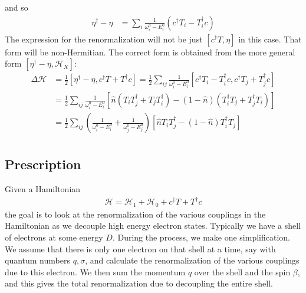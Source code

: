 and so
\begin{equation}\begin{aligned}
	\eta^\dagger - \eta &= \sum_i \frac{1}{\omega^0_i - E^0_i}\left(c^\dagger T_i - T_i^\dagger c\right)
\end{aligned}\end{equation}
The expression for the renormalization will not be just \(\left[c^\dagger T, \eta \right]\) in this case. That form will be non-Hermitian. The correct form is obtained from the more general form \(\left[\eta^\dagger - \eta, \mathcal{H}_X \right]\):
\begin{equation}\begin{aligned}
	\Delta \mathcal{H} &= \frac{1}{2}\left[\eta^\dagger - \eta, c^\dagger T + T^\dagger c\right] = \frac{1}{2}\sum_{ij} \frac{1}{\omega^0_i - E^0_i}\left[c^\dagger T_i - T_i^\dagger c, c^\dagger T_j + T_j^\dagger c\right]\\
		    &= \frac{1}{2}\sum_{ij} \frac{1}{\omega^0_i - E^0_i}\left[\hat n \left(T_i T_j^\dagger + T_j T_i^\dagger \right) - \left(1 - \hat n\right)\left(T_i^\dagger T_j + T_j^\dagger T_i\right)\right]\\
		    &= \frac{1}{2}\sum_{ij} \left(\frac{1}{\omega^0_i - E^0_i} + \frac{1}{\omega^0_j - E^0_j}\right)\left[\hat n T_i T_j^\dagger - \left(1 - \hat n\right)T_i^\dagger T_j\right]\\ 
\end{aligned}\end{equation}

\subsection*{Prescription}
Given a Hamiltonian
\begin{equation}\begin{aligned}
\mathcal{H} = \mathcal{H}_1 + \mathcal{H}_0 + c^\dagger T + T^\dagger c
\end{aligned}\end{equation}
the goal is to look at the renormalization of the various couplings in the Hamiltonian as we decouple high energy electron states. Typically we have a shell of electrons at some energy \(D\). During the process, we make one simplification. We assume that there is only one electron on that shell at a time, say with quantum numbers \(q,\sigma\), and calculate the renormalization of the various couplings due to this electron. We then sum the momentum \(q\) over the shell and the spin \(\beta\), and this gives the total renormalization due to decoupling the entire shell. 

